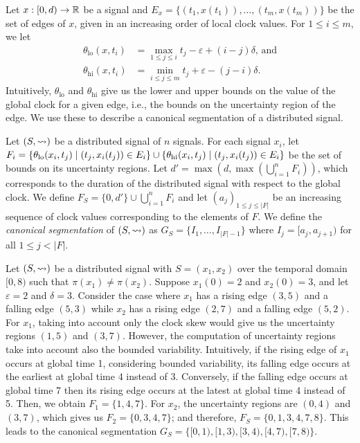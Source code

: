 Let $x : [0,d) \to \mathbb{R}$ be a signal and $E_x = \{(t_1, x(t_1)), \ldots, (t_m, x(t_m))\}$ be the set of edges of $x$, given in an increasing order of local clock values.
For $1 \leq i \leq m$, we let 
\begin{align*}
	\theta_{\text{lo}}(x,t_i) &= \max_{1 \leq j \leq i} t_j - \varepsilon + (i-j)\delta \text{, and} \\
	\theta_{\text{hi}}(x,t_i) &= \min_{i \leq j \leq m} t_j + \varepsilon - (j-i)\delta.
\end{align*}
Intuitively, $\theta_{\text{lo}}$ and $\theta_{\text{hi}}$ give us the lower and upper bounds on the value of the global clock for a given edge, i.e., the bounds on the uncertainty region of the edge.
We use these to describe a canonical segmentation of a distributed signal.

Let $(S,{\rightsquigarrow})$ be a distributed signal of $n$ signals.
For each signal $x_i$, let $F_i = \{\theta_{\text{lo}}(x_i, t_j) \st (t_j, x_i(t_j)) \in E_i\} \cup \{\theta_{\text{hi}}(x_i, t_j) \st (t_j, x_i(t_j)) \in E_i \}$ be the set of bounds on its uncertainty regions.
Let $d' = \max(d, \max (\bigcup_{i = 1}^{n} F_i))$, which corresponds to the duration of the distributed signal with respect to the global clock.
%
We define $F_S = \{0, d'\} \cup \bigcup_{i = 1}^{n} F_i$ and let $(a_j)_{1 \leq j \leq |F|}$ be an increasing sequence of clock values corresponding to the elements of $F$.
We define the \emph{canonical segmentation} of $(S,{\rightsquigarrow})$ as $G_S = \{I_1, \ldots, I_{|F| - 1}\}$ where $I_j = [a_j, a_{j+1})$ for all $1 \leq j < |F|$.

\begin{example} \label{ex:canonseg}
	Let $(S, {\rightsquigarrow})$ be a distributed signal with $S = (x_1, x_2)$ over the temporal domain $[0,8)$ such that $\pi(x_1) \neq \pi(x_2)$.
	Suppose $x_1(0) = 2$ and $x_2(0) = 3$, and let $\varepsilon = 2$ and $\delta = 3$.	
	Consider the case where $x_1$ has a rising edge $(3,5)$ and a falling edge $(5,3)$ while $x_2$ has a rising edge $(2,7)$ and a falling edge $(5,2)$.
	For $x_1$, taking into account only the clock skew would give us the uncertainty regions $(1,5)$ and $(3,7)$.
	However, the computation of uncertainty regions take into account also the bounded variability.
	Intuitively, if the rising edge of $x_1$ occurs at global time 1, considering bounded variability, its falling edge occurs at the earliest at global time 4 instead of 3.
	Conversely, if the falling edge occurs at global time 7 then its rising edge occurs at the latest at global time 4 instead of 5.
	Then, we obtain $F_1 = \{1, 4, 7\}$.
	For $x_2$, the uncertainty regions are $(0,4)$ and $(3,7)$, which gives us $F_2 = \{0, 3, 4, 7\}$; and therefore, $F_S = \{0, 1, 3, 4, 7, 8\}$.
	This leads to the canonical segmentation $G_S = \{[0,1), [1,3) ,[3,4) ,[4,7) ,[7,8)\}$.		
\end{example}

